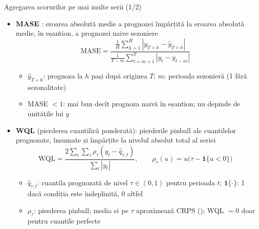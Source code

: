 \begin{frame}{Agregarea scorurilor pe mai multe serii (1/2)}
\itemsize{\small}
\begin{itemize}
    \item \textbf{MASE} : eroarea absolută medie a prognozei împărțită la eroarea absolută medie, în eșantion, a prognozei naive sezoniere \[ \mathrm{MASE} = \frac{\frac{1}{H}\sum_{h=1}^{H}|y_{T+h} - \hat y_{T+h}|}{\frac{1}{T-m}\sum_{t=m+1}^{T}|y_t - y_{t-m}|} \]
    \begin{itemize}
        \item $\hat y_{T+h}$: prognoza la $h$ pași după originea $T$; $m$: perioada sezonieră (1 fără sezonalitate)
        \item MASE $< 1$: mai bun decît prognoza naivă în eșantion; nu depinde de unitățile lui $y$
    \end{itemize}
    \item \textbf{WQL} (pierderea cuantilică ponderată): pierderile pinball ale cuantilelor prognozate, însumate și împărțite la nivelul absolut total al seriei \[ \mathrm{WQL} = \frac{2\sum_{t}\sum_{\tau}\rho_\tau(y_t - \hat q_{\tau,t})}{\sum_t|y_t|}, \qquad \rho_\tau(u) = u\big(\tau - \mathbf 1\{u < 0\}\big) \]
    \begin{itemize}
        \item $\hat q_{\tau,t}$: cuantila prognozată de nivel $\tau \in (0, 1)$ pentru perioada $t$; $\mathbf 1\{\cdot\}$: 1 dacă condiția este îndeplinită, 0 altfel
        \item $\rho_\tau$: pierderea pinball; media ei pe $\tau$ aproximează CRPS (); WQL $= 0$ doar pentru cuantile perfecte
    \end{itemize}
\end{itemize}
\end{frame}


